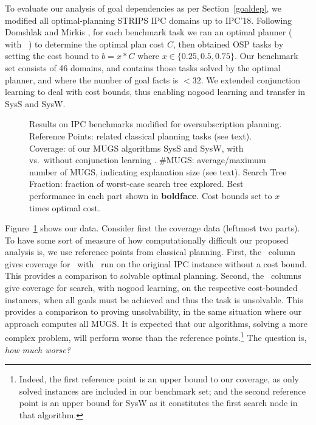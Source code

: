 To evaluate our analysis of goal dependencies as per
Section~\ref{goaldep}, we modified all optimal-planning STRIPS IPC
domains up to IPC'18. Following Domshlak and
Mirkis , for each benchmark task we
ran an optimal planner (\astar
with \hlmcut\ \cite{helmert:domshlak:icaps-09}) to determine the
optimal plan cost $C$, then obtained OSP tasks by setting the cost
bound to $b = x * C$ where $x \in \{0.25, 0.5, 0.75\}$. Our benchmark
set consists of 46 domains, and contains those tasks solved by the
optimal planner, and where the number of goal facts is $< 32$.
%
%
We extended conjunction learning \cite{steinmetz:hoffmann:ai-17} to
deal with cost bounds, thus enabling nogood learning and transfer in
SysS and SysW.


\setlength{\tabcolsep}{2pt}
\renewcommand{\arraystretch}{0.8}
\begin{figure}[h!]
	\tiny
	\centering  
        \vspace{-0.2cm}
	\caption{Results on IPC benchmarks modified for oversubscription planning. Reference Points: related classical planning tasks (see text). Coverage: of our MUGS algorithms SysS and SysW, with vs.\ without conjunction learning \hc. \#MUGS: average/maximum number of MUGS, indicating explanation size (see text). Search Tree Fraction: fraction of worst-case search tree explored. Best performance in each part shown in \textbf{boldface}. Cost bounds set to $x$ times optimal cost.}
	\label{table:coverage_ipc}
        \vspace{-0.5cm}
\end{figure}

Figure~\ref{table:coverage_ipc} shows our data. Consider first the
coverage data (leftmost two parts). To have some sort of measure of
how computationally difficult our proposed analysis is, we use
reference points from classical planning. First, the \hlmcut\ column
gives coverage for \astar\ with \hlmcut\ run on the original IPC
instance without a cost bound. This provides a comparison to solvable
optimal planning. Second, the \hc\ columns give coverage for search,
with nogood learning, on the respective cost-bounded instances, when
all goals must be achieved and thus the task is unsolvable. This
provides a comparison to proving unsolvability, in the same situation
where our approach computes all MUGS.
%
It is expected that our algorithms, solving a more complex problem,
will perform worse than the reference points.\footnote{Indeed, the
first reference point is an upper bound to our coverage, as only
solved instances are included in our benchmark set; and the second
reference point is an upper bound for SysW as it constitutes the first
search node in that algorithm.} The question is, \emph{how much
worse?}

